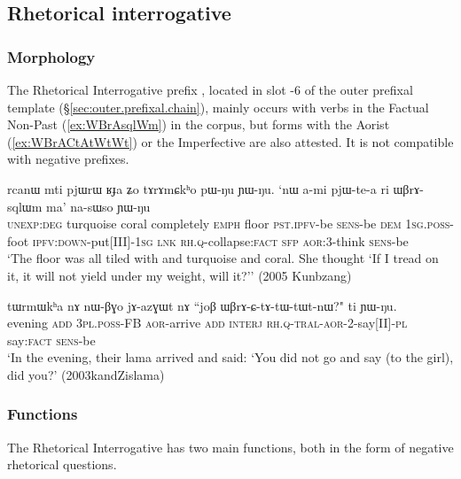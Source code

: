 
\subsection{Rhetorical interrogative} \label{sec:WBrA} 
\subsubsection{Morphology} \label{sec:WBrA.morphology} 
The Rhetorical Interrogative prefix , located in slot -6 of the outer prefixal template (§\ref{sec:outer.prefixal.chain}),  mainly occurs with verbs in the Factual Non-Past (\ref{ex:WBrAsqlWm}) in the corpus, but forms with the Aorist (\ref{ex:WBrACtAtWtWt}) or the Imperfective are also attested. It is not compatible with negative prefixes.

\begin{exe}
\ex \label{ex:WBrAsqlWm}
\gll rcanɯ mti pjɯrɯ ʁɟa ʑo tɤrɤmɕkʰo pɯ-ŋu ɲɯ-ŋu. `nɯ a-mi pjɯ-te-a ri ɯβrɤ-sqlɯm ma' na-sɯso ɲɯ-ŋu \\
\textsc{unexp}:\textsc{deg} turquoise  coral completely \textsc{emph} floor \textsc{pst}.\textsc{ipfv}-be \textsc{sens}-be \textsc{dem} \textsc{1sg}.\textsc{poss}-foot \textsc{ipfv}:\textsc{down}-put[III]-\textsc{1sg} \textsc{lnk} \textsc{rh}.\textsc{q}-collapse:\textsc{fact} \textsc{sfp} \textsc{aor}:3\flobv{}-think \textsc{sens}-be \\
\glt `The floor was all tiled with and turquoise and coral. She thought `If I tread on it, it will not yield under my weight, will it?'' (2005 Kunbzang)
\end{exe}

\begin{exe}
\ex \label{ex:WBrACtAtWtWt}
\gll tɯrmɯkʰa nɤ nɯ-βɣo jɤ-azɣɯt nɤ ``joβ ɯβrɤ-ɕ-tɤ-tɯ-tɯt-nɯ?" ti ɲɯ-ŋu. \\
evening \textsc{add} \textsc{3pl}.\textsc{poss}-FB \textsc{aor}-arrive \textsc{add} \textsc{interj} \textsc{rh}.\textsc{q}-\textsc{tral}-\textsc{aor}-2-say[II]-\textsc{pl} say:\textsc{fact} \textsc{sens}-be \\
\glt `In the evening, their lama arrived and said: `You did not go and say  (to the girl), did you?' (2003kandZislama)
 \end{exe}
 
\subsubsection{Functions} \label{sec:WBrA.functions} 
The Rhetorical Interrogative has two main functions, both in the form of negative rhetorical questions. 

